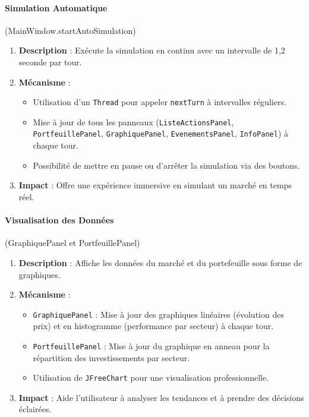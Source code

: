 \vspace{0.5cm}

\paragraph{Simulation Automatique} (MainWindow.startAutoSimulation)

\begin{enumerate}
    \item \textbf{Description} : Exécute la simulation en continu avec un intervalle de 1,2 seconde par tour.
    
    \item \textbf{Mécanisme} :
    \begin{itemize}
        \item Utilisation d'un \texttt{Thread} pour appeler \texttt{nextTurn} à intervalles réguliers.
        \item Mise à jour de tous les panneaux (\texttt{ListeActionsPanel}, \texttt{PortfeuillePanel}, \texttt{GraphiquePanel}, \texttt{EvenementsPanel}, \texttt{InfoPanel}) à chaque tour.
        \item Possibilité de mettre en pause ou d'arrêter la simulation via des boutons.
    \end{itemize}
    
    \item \textbf{Impact} : Offre une expérience immersive en simulant un marché en temps réel.
\end{enumerate}

\vspace{0.5cm}

\paragraph{Visualisation des Données} (GraphiquePanel et PortfeuillePanel)

\begin{enumerate}
    \item \textbf{Description} : Affiche les données du marché et du portefeuille sous forme de graphiques.
    
    \item \textbf{Mécanisme} :
    \begin{itemize}
        \item \texttt{GraphiquePanel} : Mise à jour des graphiques linéaires (évolution des prix) et en histogramme (performance par secteur) à chaque tour.
        \item \texttt{PortfeuillePanel} : Mise à jour du graphique en anneau pour la répartition des investissements par secteur.
        \item Utilisation de \texttt{JFreeChart} pour une visualisation professionnelle.
    \end{itemize}
    
    \item \textbf{Impact} : Aide l'utilisateur à analyser les tendances et à prendre des décisions éclairées.
\end{enumerate}

